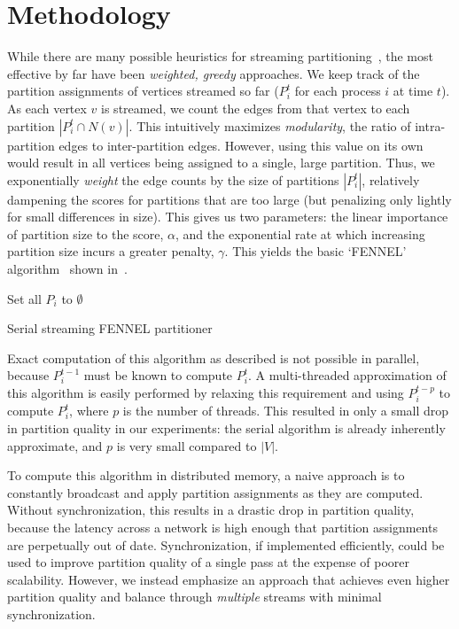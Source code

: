 \section{Methodology} \label{sec:meth}
While there are many possible heuristics for streaming partitioning~\cite{Stanton:2012:SGP:2339530.2339722}, the most effective by far have been \emph{weighted, greedy} approaches. We keep track of the partition assignments of vertices streamed so far ($P_i^t$ for each process $i$ at time $t$). As each vertex $v$ is streamed, we count the edges from that vertex to each partition $|P_i^t \cap N(v)|$. This intuitively maximizes \emph{modularity}, the ratio of intra-partition edges to inter-partition edges. However, using this value on its own would result in all vertices being assigned to a single, large partition. Thus, we exponentially \emph{weight} the edge counts by the size of partitions $|P_i^t|$, relatively dampening the scores for partitions that are too large (but penalizing only lightly for small differences in size). This gives us two parameters: the linear importance of partition size to the score, $\alpha$, and the exponential rate at which increasing partition size incurs a greater penalty, $\gamma$. This yields the basic `FENNEL' algorithm~\cite{tsourakakis2012fennel} shown in~.

\begin{algorithm}
 Set all $P_i$ to $\emptyset$\;
 \caption{Serial streaming FENNEL partitioner}
 \label{alg:fennel}
\end{algorithm}

Exact computation of this algorithm as described is not possible in parallel, because $P_i^{t-1}$ must be known to compute $P_i^t$. A multi-threaded approximation of this algorithm is easily performed by relaxing this requirement and using $P_i^{t-p}$ to compute $P_i^t$, where $p$ is the number of threads. This resulted in only a small drop in partition quality in our experiments: the serial algorithm is already inherently approximate, and $p$ is very small compared to $|V|$.

To compute this algorithm in distributed memory, a naive approach is to constantly broadcast and apply partition assignments as they are computed. Without synchronization, this results in a drastic drop in partition quality, because the latency across a network is high enough that partition assignments are perpetually out of date. Synchronization, if implemented efficiently, could be used to improve partition quality of a single pass at the expense of poorer scalability. However, we instead emphasize an approach that achieves even higher partition quality and balance through \emph{multiple} streams with minimal synchronization.

